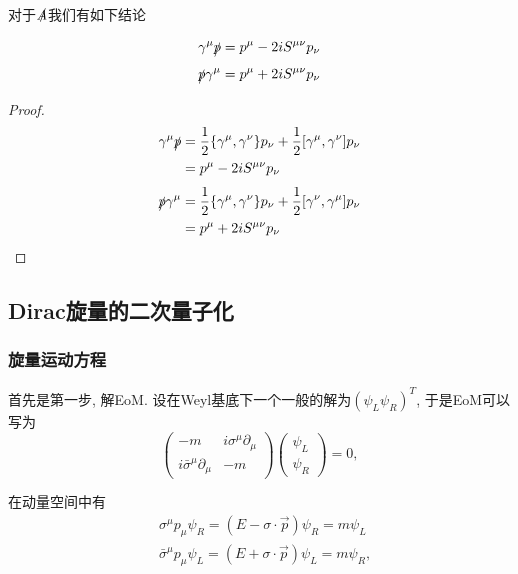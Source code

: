 对于$\slashed A$我们有如下结论\cite{sredinicki-ugammau}
\begin{theorem}\label{gamma-p-contraction}
    \begin{equation}
        \gamma^\mu\slashed p=p^\mu-2iS^{\mu\nu}p_\nu
    \end{equation}
    \begin{equation}
        \slashed p\gamma^\mu=p^\mu+2iS^{\mu\nu}p_\nu
    \end{equation}
\end{theorem}
\begin{proof}
    \begin{align}
        \gamma^\mu\slashed p&=\frac12\{\gamma^\mu, \gamma^\nu\}p_\nu+\frac12[\gamma^\mu, \gamma^\nu]p_\nu\\
        &=p^\mu-2iS^{\mu\nu}p_\nu
    \end{align}
    \begin{align}
        \slashed p\gamma^\mu&=\frac12\{\gamma^\mu, \gamma^\nu\}p_\nu+\frac12[\gamma^\nu, \gamma^\mu]p_\nu\\
        &=p^\mu+2iS^{\mu\nu}p_\nu
    \end{align}
\end{proof}

\subsection{Dirac旋量的二次量子化\label{2ndq-dirac}}
\subsubsection{旋量运动方程}
首先是第一步, 解EoM. 设在Weyl基底下一个一般的解为$(\psi_L \psi_R)^T$, 于是EoM可以写为
\begin{equation}
    \begin{pmatrix}
        -m & i\sigma^\mu\partial_\mu\\
        i\bar\sigma^\mu\partial_\mu & -m
    \end{pmatrix}\begin{pmatrix}
        \psi_L\\
        \psi_R
    \end{pmatrix}=0,
\end{equation}

在动量空间中有
\begin{align}
    &\sigma^\mu p_\mu\psi_R=(E-\sigma\cdot\vec p)\psi_R=m\psi_L\\
    &\bar\sigma^\mu p_\mu\psi_L=(E+\sigma\cdot\vec p)\psi_L=m\psi_R,
\end{align}

